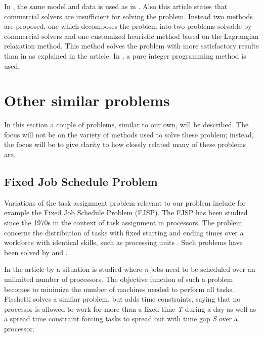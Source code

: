 In \citet{hojati_2011}, the same model and data is used as in \citet{loucks_1991}. Also this article states that commercial solvers are insufficient for solving the problem. Instead two methods are proposed, one which decomposes the problem into two problems solvable by commercial solvers and one customized heuristic method based on the Lagrangian relaxation method. This method solves the problem with more satisfactory results than in \citet{loucks_1991} as explained in the article. In \citet{choi_hwang_park_2009}, a pure integer programming method is used.


\section{Other similar problems}\label{other}
In this section a couple of problems, similar to our own, will be described. The focus will not be on the variety of methods used to solve these problem; instead, the focus will be to give clarity to how closely related many of these problems are.
\subsection{Fixed Job Schedule Problem}
Variations of the task assignment problem relevant to our problem include for example the Fixed Job Schedule Problem (FJSP). The FJSP has been studied since the 1970s in the context of task assignment in processors. The problem concerns the distribution of tasks with fixed starting and ending times over a workforce with identical skills, such as processing units \citet{krishnamoorthy_2012}. Such problems have been solved by \citet{gertsbakh_1977} and \citet{fischetti_1992}.

In the article by \citet{gertsbakh_1977} a situation is studied where \textit{n} jobs need to be scheduled over an unlimited number of processors. The objective function of such a problem becomes to minimize the number of machines needed to perform all tasks. Fischetti solves a similar problem, but adds time constraints, saying that no processor is allowed to work for more than a fixed time \textit{T} during a day as well as a spread time constraint forcing tasks to spread out with time gap \textit{S} over a processor.

 	
